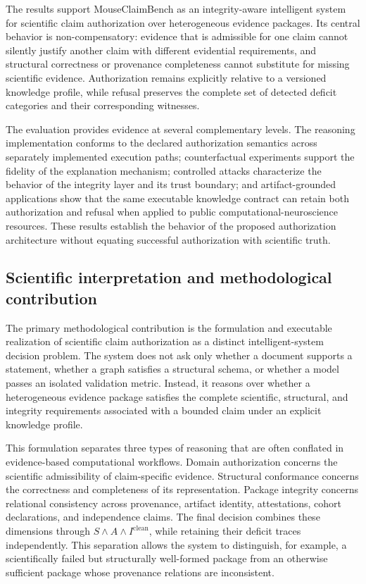 \documentclass[11pt,a4paper]{article}
\begin{document}
The results support MouseClaimBench as an integrity-aware intelligent system
for scientific claim authorization over heterogeneous evidence packages.
Its central behavior is non-compensatory: evidence that is admissible for one
claim cannot silently justify another claim with different evidential
requirements, and structural correctness or provenance completeness cannot
substitute for missing scientific evidence. Authorization remains explicitly
relative to a versioned knowledge profile, while refusal preserves the
complete set of detected deficit categories and their corresponding
witnesses.

The evaluation provides evidence at several complementary levels. The
reasoning implementation conforms to the declared authorization semantics
across separately implemented execution paths; counterfactual experiments
support the fidelity of the explanation mechanism; controlled attacks
characterize the behavior of the integrity layer and its trust boundary; and
artifact-grounded applications show that the same executable knowledge
contract can retain both authorization and refusal when applied to public
computational-neuroscience resources. These results establish the behavior of
the proposed authorization architecture without equating successful
authorization with scientific truth.


\subsection{Scientific interpretation and methodological contribution}
\label{subsec:interpretation-novelty}

The primary methodological contribution is the formulation and executable
realization of scientific claim authorization as a distinct intelligent-system
decision problem. The system does not ask only whether a document supports a
statement, whether a graph satisfies a structural schema, or whether a model
passes an isolated validation metric. Instead, it reasons over whether a
heterogeneous evidence package satisfies the complete scientific, structural,
and integrity requirements associated with a bounded claim under an explicit
knowledge profile.

This formulation separates three types of reasoning that are often conflated
in evidence-based computational workflows. Domain authorization concerns the
scientific admissibility of claim-specific evidence. Structural conformance
concerns the correctness and completeness of its representation. Package
integrity concerns relational consistency across provenance, artifact
identity, attestations, cohort declarations, and independence claims. The
final decision combines these dimensions through
$S\land A\land I^{\mathrm{clean}}$, while retaining their deficit traces
independently. This separation allows the system to distinguish, for example,
a scientifically failed but structurally well-formed package from an
otherwise sufficient package whose provenance relations are inconsistent.
\end{document}
